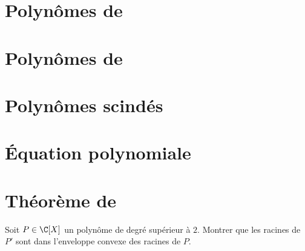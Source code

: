 \section{Polynômes de } 


\section{Polynômes de } 


\section{Polynômes scindés} 


\section{Équation polynomiale} 


\section{Théorème de }
\begin{theo}
    Soit $P \in \C[X]$ un polynôme de degré supérieur à $2$. Montrer que les racines de $P'$ sont dans l'enveloppe convexe des racines de $P$.
\end{theo}